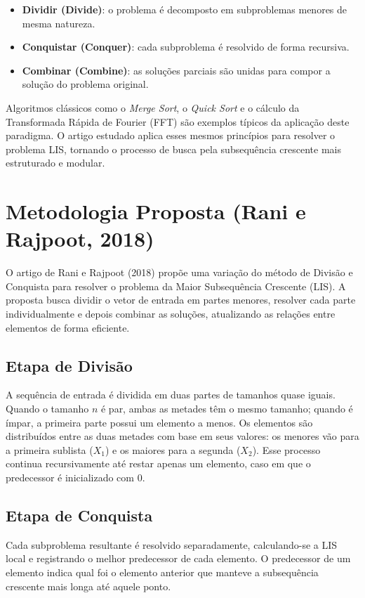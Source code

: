 \documentclass[por]{ajceam-class}
\begin{document}
\begin{itemize}
    \item \textbf{Dividir (Divide)}: o problema é decomposto em subproblemas menores de mesma natureza.
    \item \textbf{Conquistar (Conquer)}: cada subproblema é resolvido de forma recursiva.
    \item \textbf{Combinar (Combine)}: as soluções parciais são unidas para compor a solução do problema original.
\end{itemize}

Algoritmos clássicos como o \textit{Merge Sort}, o \textit{Quick Sort} e o cálculo da Transformada Rápida de Fourier (FFT) são exemplos típicos da aplicação deste paradigma.  
O artigo estudado aplica esses mesmos princípios para resolver o problema LIS, tornando o processo de busca pela subsequência crescente mais estruturado e modular.

\section{Metodologia Proposta (Rani e Rajpoot, 2018)}
\label{sec:metodologia}
O artigo de Rani e Rajpoot (2018) propõe uma variação do método de Divisão e Conquista para resolver o problema da Maior Subsequência Crescente (LIS).  
A proposta busca dividir o vetor de entrada em partes menores, resolver cada parte individualmente e depois combinar as soluções, atualizando as relações entre elementos de forma eficiente.

\subsection{Etapa de Divisão}

A sequência de entrada é dividida em duas partes de tamanhos quase iguais.  
Quando o tamanho $n$ é par, ambas as metades têm o mesmo tamanho; quando é ímpar, a primeira parte possui um elemento a menos.  
Os elementos são distribuídos entre as duas metades com base em seus valores: os menores vão para a primeira sublista ($X_1$) e os maiores para a segunda ($X_2$).  
Esse processo continua recursivamente até restar apenas um elemento, caso em que o predecessor é inicializado com 0.

\subsection{Etapa de Conquista}

Cada subproblema resultante é resolvido separadamente, calculando-se a LIS local e registrando o melhor predecessor de cada elemento.  
O predecessor de um elemento indica qual foi o elemento anterior que manteve a subsequência crescente mais longa até aquele ponto.
\end{document}
